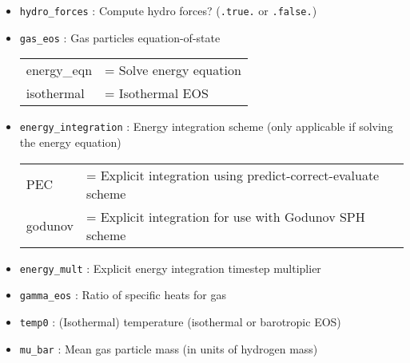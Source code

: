 \documentclass[a4paper]{article}
\newcommand{\var}[1]{\texttt{#1}}
\begin{document}
\begin{itemize}
\item \var{hydro\_forces} : Compute hydro forces?  (\var{.true.} or \var{.false.})

\item \var{gas\_eos} : Gas particles equation-of-state \\
\begin{tabular}{ll}
energy\_eqn & = Solve energy equation \\
isothermal  & = Isothermal EOS
\end{tabular}


\item \var{energy\_integration} : Energy integration scheme (only applicable if solving the energy equation) \\
\begin{tabular}{ll}
PEC         & = Explicit integration using predict-correct-evaluate scheme \\
godunov     & = Explicit integration for use with Godunov SPH scheme
\end{tabular}

\item \var{energy\_mult} : Explicit energy integration timestep multiplier

\item \var{gamma\_eos} : Ratio of specific heats for gas

\item \var{temp0} : (Isothermal) temperature (isothermal or barotropic EOS)

\item \var{mu\_bar}    : Mean gas particle mass (in units of hydrogen mass)





\end{itemize}
\end{document}
